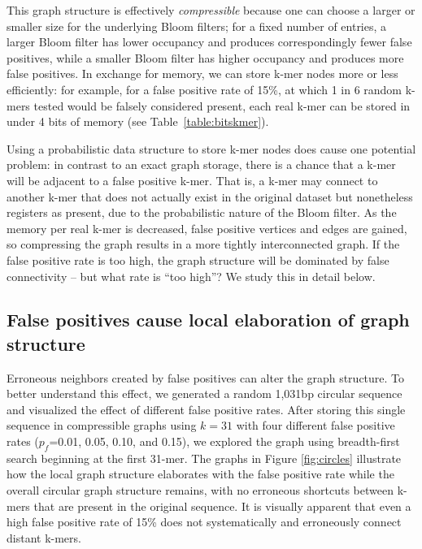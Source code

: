 \documentclass{pnastwo}
\begin{document}
\begin{article}
This graph structure is effectively {\em compressible} because one can
choose a larger or smaller size for the underlying Bloom filters; for
a fixed number of entries, a larger Bloom filter has lower occupancy
and produces correspondingly fewer false positives, while a smaller
Bloom filter has higher occupancy and produces more false
positives. In exchange for memory, we can store k-mer nodes more or
less efficiently: for example, for a false positive rate of 15\%, at
which 1 in 6 random k-mers tested would be falsely considered present,
each real k-mer can be stored in under 4 bits of memory (see
Table~\ref{table:bitskmer}).

Using a probabilistic data structure to store k-mer nodes does
cause one potential problem: in contrast to an exact graph storage, there is a chance that a k-mer
will be adjacent to a false positive k-mer.  That is, a k-mer may
connect to another k-mer that does not actually exist in the original
dataset but nonetheless registers as present, due to the probabilistic
nature of the Bloom filter.  As the memory per real k-mer is
decreased, false positive vertices and edges are gained, so
compressing the graph results in a more tightly interconnected graph.
If the false positive rate is too high, the graph structure will be
dominated by false connectivity -- but what rate is ``too high''?  We
study this in detail below.

\subsection{False positives cause local elaboration of graph structure}

Erroneous neighbors created by false positives can alter the graph
structure.  To better understand this effect, we generated a random
1,031bp circular sequence and visualized the effect of different false
positive rates.  After storing this single sequence in compressible
graphs using $k=31$ with four different false positive rates
($p_f$=0.01, 0.05, 0.10, and 0.15), we explored the graph using
breadth-first search beginning at the first 31-mer.  The graphs in
Figure \ref{fig:circles} illustrate how the local graph structure elaborates with the
false positive rate while the overall circular graph structure
remains, with no erroneous shortcuts between k-mers that are present
in the original sequence.  It is visually apparent that even a high false positive rate of 15\% does not systematically and erroneously connect distant k-mers.


\end{article}
\end{document}
